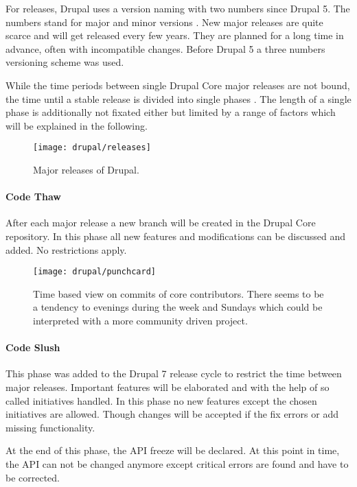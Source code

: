 For releases, Drupal uses a version naming with two numbers since Drupal 5. The
numbers stand for major and minor versions \cite{DrupalUpgrade}. New major
releases are quite scarce and will get released every few years. They are
planned for a long time in advance, often with incompatible changes. Before
Drupal 5 a three numbers versioning scheme was used.

While the time periods between single Drupal Core major releases are not bound,
the time until a stable release is divided into single phases
\cite{DrupalReleaseCycle}. The length of a single phase is additionally not
fixated either but limited by a range of factors which will be explained in the
following.

\begin{figure}[htbp]
  \centering
  \texttt{[image: drupal/releases]}
  \caption{Major releases of Drupal.}
\end{figure}

\paragraph{Code Thaw}

After each major release a new branch will be created in the Drupal Core
repository. In this phase all new features and modifications can be discussed
and added. No restrictions apply.

\begin{figure}[htbp]
  \centering
  \texttt{[image: drupal/punchcard]}
  \caption{Time based view on commits of core contributors. There seems to be a
  tendency to evenings during the week and Sundays which could be interpreted
  with a more community driven project.}
\end{figure}

\paragraph{Code Slush}

This phase was added to the Drupal 7 release cycle to restrict the time between
major releases. Important features will be elaborated and with the help of so
called initiatives handled. In this phase no new features except the chosen
initiatives are allowed. Though changes will be accepted if the fix errors or
add missing functionality.

At the end of this phase, the \ac{API} freeze will be declared. At this point
in time, the \ac{API} can not be changed anymore except critical errors are
found and have to be corrected.

